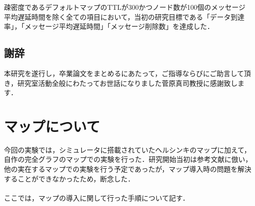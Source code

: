 \documentclass[11pt]{icsthesis}
\begin{document}
疎密度であるデフォルトマップのTTLが300かつノード数が100個のメッセージ平均遅延時間を除く全ての項目において，当初の研究目標である「データ到達率」，「メッセージ平均遅延時間」「メッセージ削除数」を達成した．






\clearpage
\fancyhead[L]{}\fancyhead[R]{}
\renewcommand{\headrulewidth}{0truemm}
\section*{謝辞}
本研究を遂行し，卒業論文をまとめるにあたって，ご指導ならびにご助言して頂き，研究室活動全般にわたってお世話になりました菅原真司教授に感謝致します．

\clearpage
\nocite{*}

\fancyhead[L]{\nouppercase{\small\leftmark}}\fancyhead[R]{}
\renewcommand{\headrulewidth}{0.3truemm}


\clearpage
\fancyhead[L]{\nouppercase{\small\leftmark}}
\fancyhead[R]{\nouppercase{\small\rightmark}}
\fancyfoot[C]{--\ \thepage\ --}
\renewcommand{\headrulewidth}{0.3truemm}
\appendix
\chapter{マップについて}
今回の実験では，シミュレータに搭載されていたヘルシンキのマップに加えて，自作の完全グラフのマップでの実験を行った．研究開始当初は参考文献に倣い，他の実在するマップでの実験を行う予定であったが，マップ導入時の問題を解決することができなかったため，断念した．\\\\
ここでは，マップの導入に関して行った手順について記す．
\end{document}
